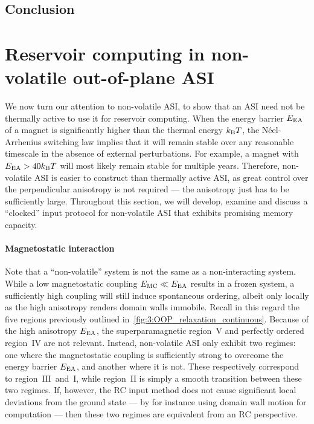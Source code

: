 \subsection{Conclusion} %

\newpage
\section{Reservoir computing in non-volatile out-of-plane ASI}
We now turn our attention to non-volatile ASI, to show that an ASI need not be thermally active to use it for reservoir computing.
When the energy barrier $E_\mathrm{EA}$ of a magnet is significantly higher than the thermal energy $\kBT$, the N\'eel-Arrhenius switching law implies that it will remain stable over any reasonable timescale in the absence of external perturbations.
For example, a magnet with $\EEA > 40 \kBT$ will most likely remain stable for multiple years.
Therefore, non-volatile ASI is easier to construct than thermally active ASI, as great control over the perpendicular anisotropy is not required --- the anisotropy just has to be sufficiently large.
Throughout this section, we will develop, examine and discuss a ``clocked'' input protocol for non-volatile ASI that exhibits promising memory capacity.

\paragraph{Magnetostatic interaction}
Note that a ``non-volatile'' system is not the same as a non-interacting system.
While a low magnetostatic coupling $E_\mathrm{MC} \ll E_\mathrm{EA}$ results in a frozen system, a sufficiently high coupling will still induce spontaneous ordering, albeit only locally as the high anisotropy renders domain walls immobile.
Recall in this regard the five regions previously outlined in~\cref{fig:3:OOP_relaxation_continuous}.
Because of the high anisotropy $E_\mathrm{EA}$, the superparamagnetic region~$\mathrm{V}$ and perfectly ordered region~$\mathrm{IV}$ are not relevant.
Instead, non-volatile ASI only exhibit two regimes: one where the magnetostatic coupling is sufficiently strong to overcome the energy barrier $E_\mathrm{EA}$, and another where it is not.
These respectively correspond to region~$\mathrm{III}$~and~$\mathrm{I}$, while region~$\mathrm{II}$ is simply a smooth transition between these two regimes.
If, however, the RC input method does not cause significant local deviations from the ground state --- by for instance using domain wall motion for computation --- then these two regimes are equivalent from an RC perspective. \par


